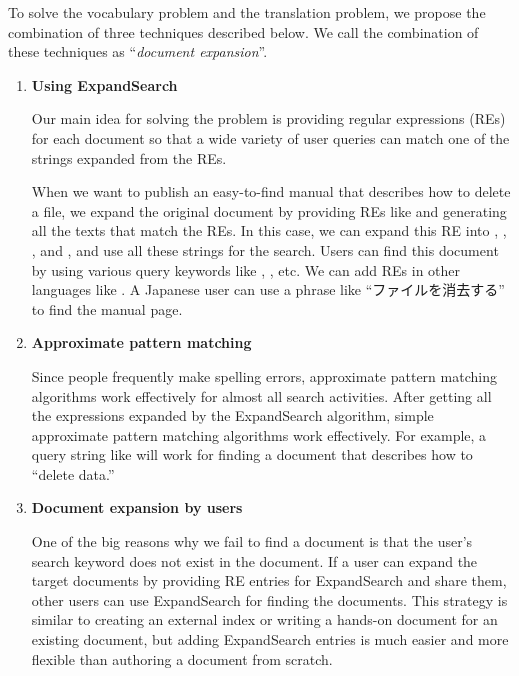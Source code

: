 \documentclass[manuscript,anonymous,review]{acmart}
\def\ES{\textsf{ExpandSearch}}
\begin{document}
To solve the vocabulary problem and the translation problem,
we propose the combination of three techniques described below.
%
We call the combination of these techniques as ``\textit{document expansion}''.

\begin{enumerate}
  
\item \textbf{Using ExpandSearch}
  
  Our main idea for solving the problem is 
  providing regular expressions (REs)
  for  each document so that a wide variety of user queries can match one of the
  strings expanded from the REs.
  
  When we want to publish an easy-to-find manual that describes how to delete a file,
  we expand the original document by
  providing REs like 
  and generating all the texts that match the REs.
  In this case, we can expand this RE into
  ,
  ,
  , and
  ,
  and use all these strings for the search.
  Users can find this document by using various query keywords like
  , , etc.
  We can add REs in other languages
  like .
  A Japanese user can use a phrase like ``ファイルを消去する'' to find the manual page.

\item \textbf{Approximate pattern matching}

  Since people frequently make spelling errors,
  approximate pattern matching algorithms
  work effectively for almost all search activities.
  After getting all the expressions expanded by the {\ES} algorithm,
  simple approximate pattern matching algorithms work effectively.
  For example, a query string like  will work for
  finding a document that describes how to ``delete data.''

\item \textbf{Document expansion by users}

  One of the big reasons why we fail to find a document is that
  the user's search keyword does not exist in the document.
  If a user can expand the target documents by
  providing RE entries for {\ES} and share them,
  other users can use {\ES} for finding the documents.
  This strategy is similar to creating an external index or
  writing a hands-on document for an existing document,
  but adding {\ES} entries is much easier and more flexible than
  authoring a document from scratch.

\end{enumerate}
\end{document}
